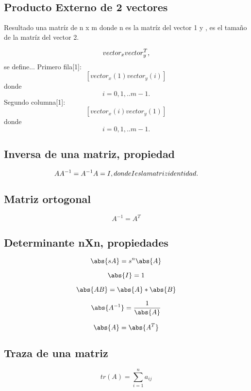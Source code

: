       \subsection{Producto Externo de 2 vectores}
      	Resultado una  matríz de  n x m donde n es la matríz del vector 1 y , es el tamaño de la
        matríz del vector 2.
        
        $$
        	vector_x \space vector_y^T,$$ \space se  \space define...\space
            Primero \space fila[1]: \space  $$ [ vector_x(1)vector_y(i) ]$$ \space donde \space $$i = 0,1,..m-1.$$ \space  Segundo \space columna[1]: \space $$ [ vector_x(i)vector_y(1) ]$$ \space donde \space $$i = 0,1,..m-1.$$
        
        
        
        \subsection{Inversa de una matriz, propiedad}
        $$
        	AA^{-1} = A^{-1}A = I, \space donde I \space es \space la \space matriz \space identidad.
        $$
        
        \subsection{Matriz ortogonal}
        
        $$A^{-1} = A^{T}$$
        
        \subsection{Determinante nXn, propiedades}
        
        $$
        	\abs{ sA} = s^n \abs{A}
        $$
        
        $$
        	\abs{I} = 1
        $$
        
        $$
        	\abs{AB} = \abs{A} * \abs{B}
        $$
        
        $$
        	\abs{A^{-1}} = \frac{1}{\abs{A}}                       
        $$
        
        $$
        	\abs{A} = \abs{A^T}
        $$
        
        \subsection {Traza de una matriz}
        
        $$tr(A) = \sum_{i=1}^n a_{ij}$$ 
    
